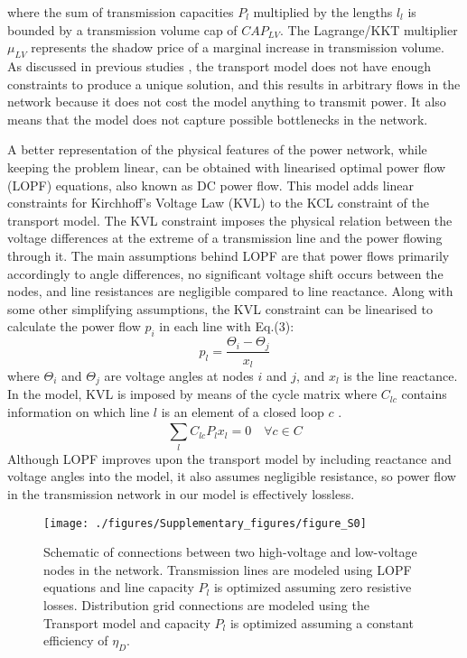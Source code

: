 where the sum of transmission capacities \(P_{l}\) multiplied by the lengths \(l_{l}\) is bounded by a transmission volume cap of \(CAP_{LV}\). The Lagrange/KKT multiplier \(\mu_{LV}\) represents the shadow price of a marginal increase in transmission volume. As discussed in previous studies , the transport model does not have enough constraints to produce a unique solution, and this results in arbitrary flows in the network because it does not cost the model anything to transmit power. It also means that the model does not capture possible bottlenecks in the network.

A better representation of the physical features of the power network, while keeping the problem linear, can be obtained with linearised optimal power flow (LOPF) equations, also known as DC power flow. This model adds linear constraints for Kirchhoff’s Voltage Law (KVL) to the KCL constraint of the transport model. The KVL constraint imposes the physical relation between the voltage differences at the extreme of a transmission line and the power flowing through it. The main assumptions behind LOPF are that power flows primarily accordingly to angle differences, no significant voltage shift occurs between the nodes, and line resistances are negligible compared to line reactance. Along with some other simplifying assumptions, the KVL constraint can be linearised to calculate the power flow \(p_{i}\) in each line with Eq.(3):
\begin{equation}
p_{l} = \frac{\Theta_{i}-\Theta_{j}}{x_{l}}
\end{equation}
where \(\Theta_{i}\) and \(\Theta_{j}\) are voltage angles at nodes \(i\) and \(j\), and \(x_{l}\) is the line reactance. In the model, KVL is imposed by means of the cycle matrix where \(C_{lc}\) contains information on which line \(l\) is an element of a closed loop \(c\) .
\begin{equation}
\sum_{l}^{} C_{lc}P_{l}x_{l}=0 \quad \forall c\in C
\end{equation}
Although LOPF improves upon the transport model by including reactance and voltage angles into the model, it also assumes negligible resistance, so power flow in the transmission network in our model is effectively lossless.
\begin{figure}[H]
\renewcommand*{\thefigure}{S\arabic{figure}}
\texttt{[image: ./figures/Supplementary\_figures/figure\_S0]}
\caption{Schematic of connections between two high-voltage and low-voltage nodes in the network. Transmission lines are modeled using LOPF equations and line capacity \(P_{l}\) is optimized assuming zero resistive losses. Distribution grid connections are modeled using the Transport model and  capacity \(P_{l}\) is optimized assuming a constant efficiency of \(\eta_{D}\). }
\end{figure}
